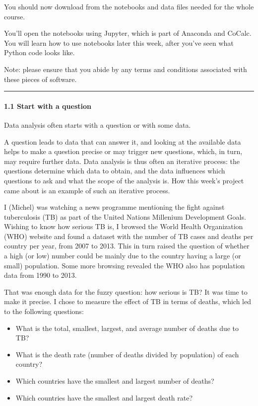 \documentclass[letterpaper,10pt,english]{sphinxmanual}
\let\sphinxpxdimen\pdfpxdimen\else\newdimen\sphinxpxdimen
\begin{document}
You should now download from  the notebooks and data files needed for the whole course.

You’ll open the notebooks using Jupyter, which is part of Anaconda and CoCalc. You will learn how to use notebooks later this week, after you’ve seen what Python code looks like.

Note: please ensure that you abide by any terms and conditions associated with these pieces of software.


\bigskip\hrule\bigskip



\paragraph{1.1 Start with a question}
\label{\detokenize{content/session_01/Part_01_02:1.1-Start-with-a-question}}
Data analysis often starts with a question or with some data.

\sphinxincludegraphics[width=512\sphinxpxdimen,height=341\sphinxpxdimen]{{ou_futurelearn_learn_to_code_fig_1026}.jpg}


A question leads to data that can answer it, and looking at the available data helps to make a question precise or may trigger new questions, which, in turn, may require further data. Data analysis is thus often an iterative process: the questions determine which data to obtain, and the data influences which questions to ask and what the scope of the analysis is. How this week’s project came about is an example of such an iterative process.

I (Michel) was watching a news programme mentioning the fight against tuberculosis (TB) as part of the United Nations Millenium Development Goals. Wishing to know how serious TB is, I browsed the World Health Organization (WHO) website and found a dataset with the number of TB cases and deaths per country per year, from 2007 to 2013. This in turn raised the question of whether a high (or low) number could be mainly due to the country having a large (or small) population. Some more browsing
revealed the WHO also has population data from 1990 to 2013.

That was enough data for the fuzzy question: how serious is TB? It was time to make it precise. I chose to measure the effect of TB in terms of deaths, which led to the following questions:
\begin{itemize}
\item {} 
What is the total, smallest, largest, and average number of deaths due to TB?

\item {} 
What is the death rate (number of deaths divided by population) of each country?

\item {} 
Which countries have the smallest and largest number of deaths?

\item {} 
Which countries have the smallest and largest death rate?

\end{itemize}
\end{document}
